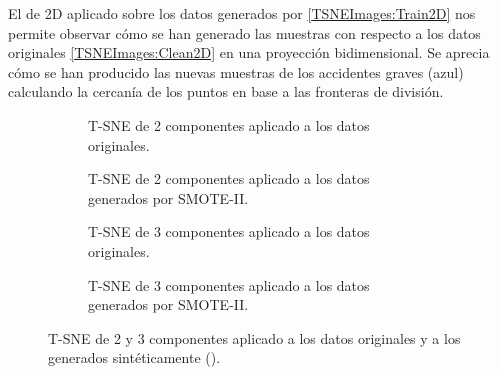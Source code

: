             El  de 2D aplicado sobre los datos generados por  \eqref{TSNEImages:Train2D} nos permite observar cómo se han generado las muestras con respecto a los datos originales \eqref{TSNEImages:Clean2D} en una proyección bidimensional. Se aprecia cómo se han producido las nuevas muestras de los accidentes graves (azul) calculando la cercanía de los puntos en base a las fronteras de división.


            \begin{figure}[H]
                \centering
                \begin{subfigure}[b]{0.4\textwidth}
                    \centering
                    
                    \caption{T-SNE de 2 componentes aplicado a los datos originales.}
                    \label{TSNEImages:Clean2D}
                \end{subfigure}
                \begin{subfigure}[b]{0.4\textwidth}
                    \centering
                    
                    \caption{T-SNE de 2 componentes aplicado a los datos generados por SMOTE-II.}
                    \label{TSNEImages:Train2D}

                \end{subfigure}
                \begin{subfigure}[b]{0.4\textwidth}
                    \centering
                    
                    \caption{T-SNE de 3 componentes aplicado a los datos originales.}
                    \label{TSNEImages:Clean3D}
                \end{subfigure}
                \begin{subfigure}[b]{0.4\textwidth}
                    \centering
                    
                    \caption{T-SNE de 3 componentes aplicado a los datos generados por SMOTE-II.}
                    \label{TSNEImages:Train3D}
                \end{subfigure}
                \caption{T-SNE de 2 y 3 componentes aplicado a los datos originales y a los generados sintéticamente ().}
                \label{TSNEImages}
             \end{figure}



